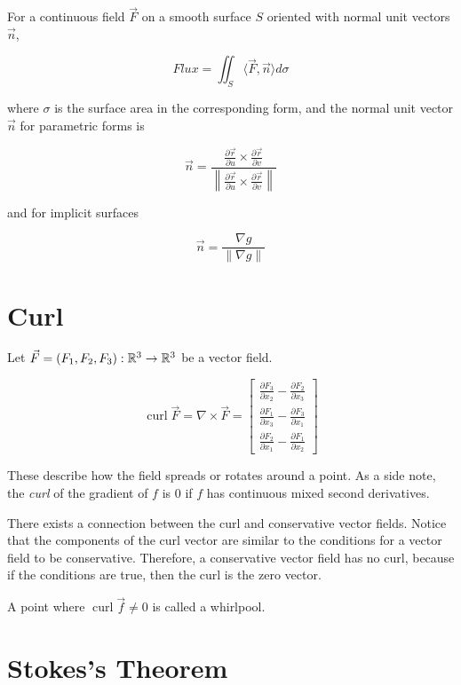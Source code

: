 For a continuous field \( \vec{F} \) on a smooth surface \( S \) oriented with normal unit vectors \( \vec{n} \), 

\[
    Flux = \iint_{S} \langle \vec{F}, \vec{n} \rangle d \sigma 
\]

where \( \sigma \) is the surface area in the corresponding form, and the normal unit vector \( \vec{n} \) for parametric forms is 

\[
    \vec{n} = \frac{ \frac{ \partial \vec{r} }{ \partial u } \times \frac{ \partial \vec{r} }{ \partial v}}
    { \left\| \frac{ \partial \vec{r} }{ \partial u } \times \frac{ \partial \vec{r} }{ \partial v} \right\| }
\]

and for implicit surfaces 

\[
    \vec{n} = \frac{ \nabla g}{ \| \nabla g \| }
\]

\section{Curl}

Let \( \vec{F} = (F_1, F_2, F_3) : \mathbb{R}^3 \to \mathbb{R}^3 \) be a vector field.

\[
    \operatorname{curl} \vec{F} = \nabla \times \vec{F} = \begin{bmatrix}
    \frac{\partial F_3}{\partial x_2} - \frac{\partial F_2}{\partial x_3} \\
    \frac{\partial F_1}{\partial x_3} - \frac{\partial F_3}{\partial x_1} \\
    \frac{\partial F_2}{\partial x_1} - \frac{\partial F_1}{\partial x_2}
    \end{bmatrix}
\]

These describe how the field spreads or rotates around a point. 
As a side note, the \emph{curl} of the gradient of \(f\) is 0 if \(f\) has continuous mixed second derivatives.

There exists a connection between the curl and conservative vector fields. Notice that the components of the curl vector 
are similar to the conditions for a vector field to be conservative. Therefore, a conservative vector field has no curl, because 
if the conditions are true, then the curl is the zero vector.

A point where \(\operatorname{curl}\vec{f} \ne  0\) is called a whirlpool. 

\section{Stokes's Theorem}

